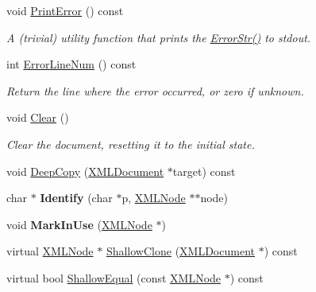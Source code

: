 \begin{DoxyCompactItemize}
void \mbox{\hyperlink{classtinyxml2_1_1XMLDocument_a1d033945b42e125d933d6231e4571552}{Print\+Error}} () const
\begin{DoxyCompactList}\small\item\em A (trivial) utility function that prints the \mbox{\hyperlink{classtinyxml2_1_1XMLDocument_ad75aa9d32c4e8b300655186808aa9abf}{Error\+Str()}} to stdout. \end{DoxyCompactList}\item 
\mbox{\label{classtinyxml2_1_1XMLDocument_a57400f816dbe7799ece33615ead9ab76}} 
int \mbox{\hyperlink{classtinyxml2_1_1XMLDocument_a57400f816dbe7799ece33615ead9ab76}{Error\+Line\+Num}} () const
\begin{DoxyCompactList}\small\item\em Return the line where the error occurred, or zero if unknown. \end{DoxyCompactList}\item 
\mbox{\label{classtinyxml2_1_1XMLDocument_a65656b0b2cbc822708eb351504178aaf}} 
void \mbox{\hyperlink{classtinyxml2_1_1XMLDocument_a65656b0b2cbc822708eb351504178aaf}{Clear}} ()
\begin{DoxyCompactList}\small\item\em Clear the document, resetting it to the initial state. \end{DoxyCompactList}\item 
void \mbox{\hyperlink{classtinyxml2_1_1XMLDocument_af592ffc91514e25a39664521ac83db45}{Deep\+Copy}} (\mbox{\hyperlink{classtinyxml2_1_1XMLDocument}{X\+M\+L\+Document}} $\ast$target) const
\item 
\mbox{\label{classtinyxml2_1_1XMLDocument_af255cf899d2bf5dbae54c9b6de9c2752}} 
char $\ast$ {\bfseries Identify} (char $\ast$p, \mbox{\hyperlink{classtinyxml2_1_1XMLNode}{X\+M\+L\+Node}} $\ast$$\ast$node)
\item 
\mbox{\label{classtinyxml2_1_1XMLDocument_a95d28ecb4760a994556b0a51690b21be}} 
void {\bfseries Mark\+In\+Use} (\mbox{\hyperlink{classtinyxml2_1_1XMLNode}{X\+M\+L\+Node}} $\ast$)
\item 
virtual \mbox{\hyperlink{classtinyxml2_1_1XMLNode}{X\+M\+L\+Node}} $\ast$ \mbox{\hyperlink{classtinyxml2_1_1XMLDocument_aa37cc1709d7e1e988bc17dcfb24a69b8}{Shallow\+Clone}} (\mbox{\hyperlink{classtinyxml2_1_1XMLDocument}{X\+M\+L\+Document}} $\ast$) const
\item 
virtual bool \mbox{\hyperlink{classtinyxml2_1_1XMLDocument_a6fe5ef18699091844fcf64b56ffa5bf9}{Shallow\+Equal}} (const \mbox{\hyperlink{classtinyxml2_1_1XMLNode}{X\+M\+L\+Node}} $\ast$) const
\end{DoxyCompactItemize}
